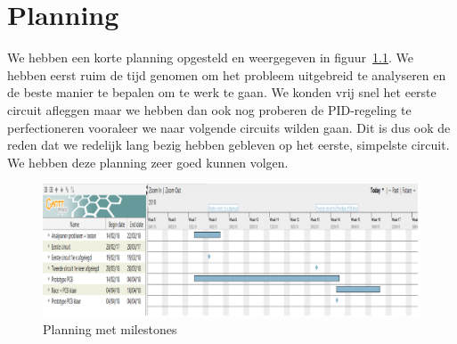 \chapter{Planning}
We hebben een korte planning opgesteld en weergegeven in figuur~\ref{fig:planning}. We hebben eerst ruim de tijd genomen om het probleem uitgebreid te analyseren en de beste manier te bepalen om te werk te gaan. We konden vrij snel het eerste circuit afleggen maar we hebben dan ook nog proberen de PID-regeling te perfectioneren vooraleer we naar volgende circuits wilden gaan. Dit is dus ook de reden dat we redelijk lang bezig hebben gebleven op het eerste, simpelste circuit. We hebben deze planning zeer goed kunnen volgen.
\begin{figure}[h]
\centering
\includegraphics[width=1\textwidth]{planning.png}
\caption{Planning met milestones}
\label{fig:planning}
\end{figure}
